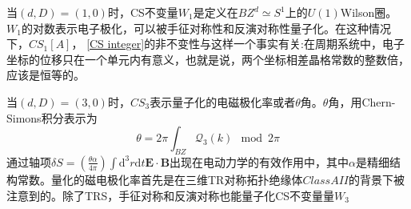 \documentclass{article}
\numberwithin{equation}{subsection}
\begin{document}
当$(d,D)=(1,0)$时，CS不变量$W_1$是定义在$BZ^d\simeq S^1$上的$U(1)$Wilson圈。$W_1$的对数表示电子极化，可以被手征对称性和反演对称性量子化。在这种情况下，$CS_1[A]$， \eqref{CS integer}的非不变性与这样一个事实有关:在周期系统中，电子坐标的位移只在一个单元内有意义，也就是说，两个坐标相差晶格常数的整数倍，应该是恒等的。

当$(d,D)=(3,0)$时，$CS_3$表示量子化的电磁极化率或者$\theta$角。$\theta$角，用Chern-Simons积分表示为
\begin{equation}
    \theta=2\pi\int_{BZ}\mathcal{Q}_3(k)\mod{2\pi}
\end{equation}
通过轴项$\delta S=(\frac{\theta\alpha}{4\pi})\int\mathrm{d}^3r\mathrm{d}t\mathbf{E}\cdot\mathbf{B}$出现在电动力学的有效作用中，其中$\alpha$是精细结构常数。量化的磁电极化率首先是在三维TR对称拓扑绝缘体$Class AII$的背景下被注意到的。除了TRS，手征对称和反演对称也能量子化CS不变量量$W_3$
\end{document}
